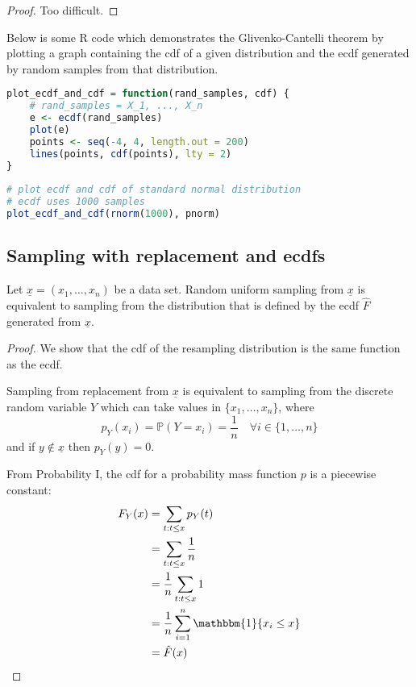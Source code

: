 \begin{proof}
	Too difficult.
\end{proof}

\begin{example}
	Below is some R code which demonstrates the Glivenko-Cantelli theorem by plotting a graph containing the cdf of a given distribution and the ecdf generated by random samples from that distribution.

	\begin{lstlisting}[language=R]
plot_ecdf_and_cdf = function(rand_samples, cdf) {
	# rand_samples = X_1, ..., X_n
	e <- ecdf(rand_samples)
	plot(e)
	points <- seq(-4, 4, length.out = 200)
	lines(points, cdf(points), lty = 2)
}
	
# plot ecdf and cdf of standard normal distribution
# ecdf uses 1000 samples
plot_ecdf_and_cdf(rnorm(1000), pnorm)
	\end{lstlisting}
\end{example}

\subsection{Sampling with replacement and ecdfs}

\begin{lemma}
	Let $\underline{x} = (x_1, \dots, x_n)$ be a data set. Random uniform sampling from $\underline{x}$ is equivalent to sampling from the distribution that is defined by the ecdf $\hat{F}$ generated from $\underline{x}$.
\end{lemma}

\begin{proof}
	We show that the cdf of the resampling distribution is the same function as the ecdf.

	Sampling from replacement from $\underline{x}$ is equivalent to sampling from the discrete random variable $Y$ which can take values in $\{ x_1, \dots, x_n \}$, where
	\[
		p_Y(x_i) = \mathbb{P}(Y = x_i) = \frac{1}{n} \quad \forall i \in \{ 1, \dots, n \}
	\]
	and if $y \notin \underline{x}$ then $p_Y(y) = 0$.

	From Probability I, the cdf for a probability mass function $p$ is a piecewise constant:
	\[
		\begin{aligned}
			F_Y(x)
				& = \sum_{t: t \le x} p_Y(t) \\
				& = \sum_{t: t \le x} \frac{1}{n} \\
				& = \frac{1}{n} \sum_{t: t \le x} 1 \\
				& = \frac{1}{n} \sum_{i = 1}^n \mathbbm{1} \{ x_i \le x \} \\
				& = \hat{F}(x)
		\end{aligned}
	\]
\end{proof}

